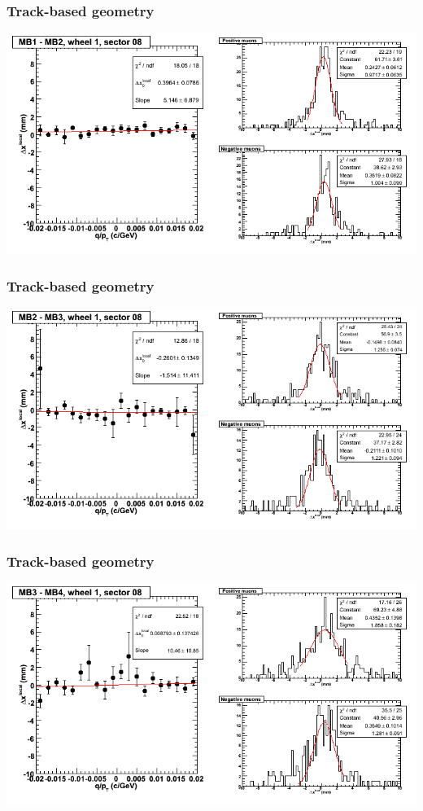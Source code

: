 \documentclass[compress]{beamer}
\begin{document}
\begin{frame}
\frametitle{Track-based geometry}
\includegraphics[width=\linewidth]{NOV4_segdiffs/dt13_resid_D_08_12.png}
\end{frame}

\begin{frame}
\frametitle{Track-based geometry}
\includegraphics[width=\linewidth]{NOV4_segdiffs/dt13_resid_D_08_23.png}
\end{frame}

\begin{frame}
\frametitle{Track-based geometry}
\includegraphics[width=\linewidth]{NOV4_segdiffs/dt13_resid_D_08_34.png}
\end{frame}
\end{document}
